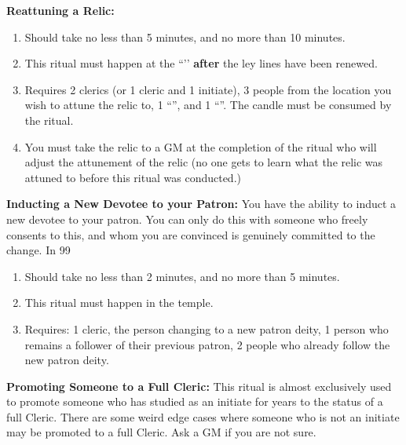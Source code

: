 \documentclass[green]{GL2020}
\begin{document}
\textbf{Reattuning a Relic:}
  \begin{enumerate}
    \item Should take no less than 5 minutes, and no more than 10 minutes.
    \item This ritual must happen at the ``\sLeyLineNexus{}’’ \textbf{after} the ley lines have been renewed.
    \item Requires 2 clerics (or 1 cleric and 1 initiate), 3 people from the location you wish to attune the relic to, 1 ``\iRitualCandle{}'', and 1 ``\iTuningFork{}''.  The candle must be consumed by the ritual.
    \item You must take the relic to a GM at the completion of the ritual who will adjust the attunement of the relic (no one gets to learn what the relic was attuned to before this ritual was conducted.)
  \end{enumerate}
   
\textbf{Inducting a New Devotee to your Patron:}
You have the ability to induct a new devotee to your patron. You can only do this with someone who freely consents to this, and whom you are convinced is genuinely committed to the change. In 99%
  \begin{enumerate}
    \item Should take no less than 2 minutes, and no more than 5 minutes.
    \item This ritual must happen in the temple.
    \item Requires: 1 cleric, the person changing to a new patron deity, 1 person who remains a follower of their previous patron, 2 people who already follow the new patron deity.
  \end{enumerate}
   
\textbf{Promoting Someone to a Full Cleric:}
This ritual is almost exclusively used to promote someone who has studied as an initiate for years to the status of a full Cleric. There are some weird edge cases where someone who is not an initiate may be promoted to a full Cleric. Ask a GM if you are not sure.
\end{document}
